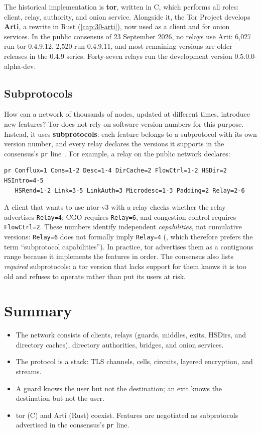 The historical implementation is \textbf{tor}, written in C, which performs all roles: client, relay, authority, and onion service. Alongside it, the Tor Project develops \textbf{Arti}, a rewrite in Rust (\cref{cap:30-arti}), now used as a client and for onion services. In the public consensus of 23 September 2026, no relays use Arti: 6,027 run tor 0.4.9.12, 2,520 run 0.4.9.11, and most remaining versions are older releases in the 0.4.9 series. Forty-seven relays run the development version 0.5.0.0-alpha-dev.

\subsection{Subprotocols}

How can a network of thousands of nodes, updated at different times, introduce new features? Tor does not rely on software version numbers for this purpose. Instead, it uses \textbf{subprotocols}: each feature belongs to a subprotocol with its own version number, and every relay declares the versions it supports in the consensus's \texttt{pr} line~. For example, a relay on the public network declares:
\begin{lstlisting}[numbers=none]
pr Conflux=1 Cons=1-2 Desc=1-4 DirCache=2 FlowCtrl=1-2 HSDir=2 HSIntro=4-5
   HSRend=1-2 Link=3-5 LinkAuth=3 Microdesc=1-3 Padding=2 Relay=2-6
\end{lstlisting}
A client that wants to use ntor-v3 with a relay checks whether the relay advertises \texttt{Relay=4}; CGO requires \texttt{Relay=6}, and congestion control requires \texttt{FlowCtrl=2}. These numbers identify independent \emph{capabilities}, not cumulative versions: \texttt{Relay=6} does not formally imply \texttt{Relay=4} (, which therefore prefers the term \enquote{subprotocol capabilities}). In practice, tor advertises them as a contiguous range because it implements the features in order. The consensus also lists \emph{required} subprotocols: a tor version that lacks support for them knows it is too old and refuses to operate rather than put its users at risk.

\section*{Summary}
\begin{itemize}
  \item The network consists of clients, relays (guards, middles, exits, HSDirs, and directory caches), directory authorities, bridges, and onion services.
  \item The protocol is a stack: TLS channels, cells, circuits, layered encryption, and streams.
  \item A guard knows the user but not the destination; an exit knows the destination but not the user.
  \item tor (C) and Arti (Rust) coexist. Features are negotiated as subprotocols advertised in the consensus's \texttt{pr} line.
\end{itemize}

